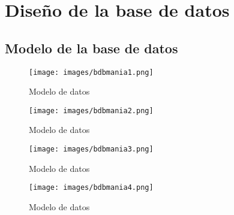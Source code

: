 \chapter{Dise\~no de la base de datos}
\section{Modelo de la base de datos}
\begin{figure}[htbp]
	\centering
		\texttt{[image: images/bdbmania1.png]}
	\caption{Modelo de datos}
	\label{fig:bdbamnia1}
\end{figure}%
\begin{figure}[htbp]
	\centering
		\texttt{[image: images/bdbmania2.png]}
	\caption{Modelo de datos}
	\label{fig:bdbamnia2}
\end{figure}%
\begin{figure}[htbp]
	\centering
		\texttt{[image: images/bdbmania3.png]}
	\caption{Modelo de datos}
	\label{fig:bdbamnia3}
\end{figure}%
\begin{figure}[htbp]
	\centering
		\texttt{[image: images/bdbmania4.png]}
	\caption{Modelo de datos}
	\label{fig:bdbamnia4}
\end{figure}%
\newpage%
